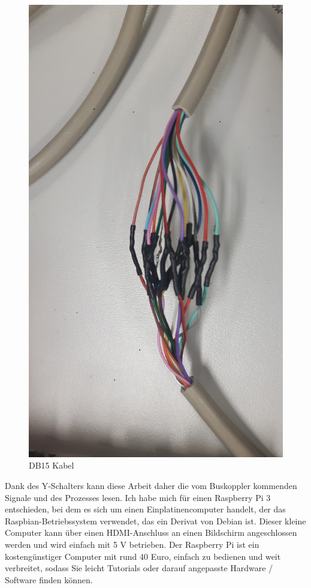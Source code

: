 \documentclass[12pt,a4paper]{scrartcl}
\numberwithin{equation}{section}
\begin{document}
\begin{figure}[ht!]
	\centering
	  \includegraphics[scale=0.10]{kabel.jpg}
	  \caption{DB15 Kabel}
	\label{kabel}
\end{figure}

Dank des Y-Schalters kann diese Arbeit daher die vom Buskoppler kommenden Signale und des Prozesses lesen. Ich habe mich für einen Raspberry Pi 3 entschieden, bei dem es sich um einen Einplatinencomputer handelt, der das Raspbian-Betriebssystem verwendet, das ein Derivat von Debian ist. Dieser kleine Computer kann über einen HDMI-Anschluss an einen Bildschirm angeschlossen werden und wird einfach mit 5 V betrieben. Der Raspberry Pi ist ein kostengünstiger Computer mit rund 40 Euro, einfach zu bedienen und weit verbreitet, sodass Sie leicht Tutorials oder darauf angepasste Hardware / Software finden können. 
\end{document}
